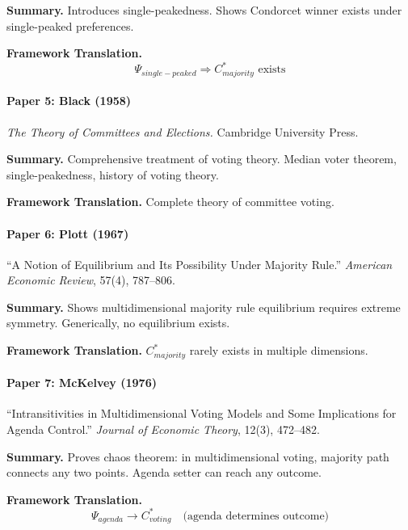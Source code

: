 \textbf{Summary.}
Introduces single-peakedness. Shows Condorcet winner exists under 
single-peaked preferences.

\textbf{Framework Translation.}
\begin{equation}
\Psi_{single-peaked} \Rightarrow C^*_{majority} \text{ exists}
\end{equation}

\paragraph{Paper 5: Black (1958)}

\textit{The Theory of Committees and Elections.}
Cambridge University Press.

\textbf{Summary.}
Comprehensive treatment of voting theory. Median voter theorem, 
single-peakedness, history of voting theory.

\textbf{Framework Translation.}
Complete theory of committee voting.

\paragraph{Paper 6: Plott (1967)}

``A Notion of Equilibrium and Its Possibility Under Majority Rule.''
\textit{American Economic Review}, 57(4), 787--806.

\textbf{Summary.}
Shows multidimensional majority rule equilibrium requires extreme symmetry.
Generically, no equilibrium exists.

\textbf{Framework Translation.}
$C^*_{majority}$ rarely exists in multiple dimensions.

\paragraph{Paper 7: McKelvey (1976)}

``Intransitivities in Multidimensional Voting Models and Some Implications 
for Agenda Control.''
\textit{Journal of Economic Theory}, 12(3), 472--482.

\textbf{Summary.}
Proves chaos theorem: in multidimensional voting, majority path connects 
any two points. Agenda setter can reach any outcome.

\textbf{Framework Translation.}
\begin{equation}
\Psi_{agenda} \to C^*_{voting} \quad \text{(agenda determines outcome)}
\end{equation}

